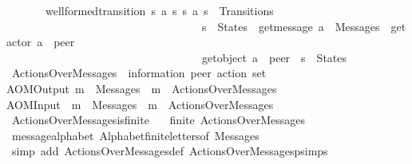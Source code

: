 \begin{isabellebody}
\ \ \ \ \ \ \ well{\isacharunderscore}{\kern0pt}formed{\isacharunderscore}{\kern0pt}transition{\isacharcolon}{\kern0pt}\ {\isachardoublequoteopen}{\isasymAnd}s{}\ a\ s{}{\isachardot}{\kern0pt}\ {\isacharparenleft}{\kern0pt}s{}{\isacharcomma}{\kern0pt}\ a{\isacharcomma}{\kern0pt}\ s{}{\isacharparenright}{\kern0pt}\ {\isasymin}\ Transitions\ {\isasymLongrightarrow}\isanewline
\ \ \ \ \ \ \ \ \ \ \ \ \ \ \ \ \ \ \ \ \ \ \ \ \ \ \ \ \ \ \ \ \ \ \ s{}\ {\isasymin}\ States\ {\isasymand}\ get{\isacharunderscore}{\kern0pt}message\ a\ {\isasymin}\ Messages\ {\isasymand}\ get{\isacharunderscore}{\kern0pt}actor\ a\ {\isacharequal}{\kern0pt}\ peer\ {\isasymand}\isanewline
\ \ \ \ \ \ \ \ \ \ \ \ \ \ \ \ \ \ \ \ \ \ \ \ \ \ \ \ \ \ \ \ \ \ \ get{\isacharunderscore}{\kern0pt}object\ a\ {\isasymnoteq}\ peer\ {\isasymand}\ s{}\ {\isasymin}\ States{\isachardoublequoteclose}\isanewline
{}\isanewline
\isanewline
{}\isamarkupfalse%
\ ActionsOverMessages\ {\isacharcolon}{\kern0pt}{\isacharcolon}{\kern0pt}\ {\isachardoublequoteopen}{\isacharparenleft}{\kern0pt}{\isacharprime}{\kern0pt}information{\isacharcomma}{\kern0pt}\ {\isacharprime}{\kern0pt}peer{\isacharparenright}{\kern0pt}\ action\ set{\isachardoublequoteclose}\ \isanewline
AOMOutput{\isacharcolon}{\kern0pt}\ {\isachardoublequoteopen}m\ {\isasymin}\ Messages\ {\isasymLongrightarrow}\ {\isacharbang}{\kern0pt}{\isasymlangle}m{\isasymrangle}\ {\isasymin}\ ActionsOverMessages{\isachardoublequoteclose}\ {\isacharbar}{\kern0pt}\isanewline
AOMInput{\isacharcolon}{\kern0pt}\ \ {\isachardoublequoteopen}m\ {\isasymin}\ Messages\ {\isasymLongrightarrow}\ {\isacharquery}{\kern0pt}{\isasymlangle}m{\isasymrangle}\ {\isasymin}\ ActionsOverMessages{\isachardoublequoteclose}\isanewline
\isanewline
{}\isamarkupfalse%
\ ActionsOverMessages{\isacharunderscore}{\kern0pt}is{\isacharunderscore}{\kern0pt}finite{\isacharcolon}{\kern0pt}\isanewline
\ \ \ {\isachardoublequoteopen}finite\ ActionsOverMessages{\isachardoublequoteclose}\isanewline
%
\isadelimproof
\ \ %
\endisadelimproof
%
\isatagproof
{}\isamarkupfalse%
\ message{\isacharunderscore}{\kern0pt}alphabet\ Alphabet{\isachardot}{\kern0pt}finite{\isacharunderscore}{\kern0pt}letters{\isacharbrackleft}{\kern0pt}of\ Messages{\isacharbrackright}{\kern0pt}\isanewline
\ \ \isamarkupfalse%
\ {\isacharparenleft}{\kern0pt}simp\ add{\isacharcolon}{\kern0pt}\ ActionsOverMessages{\isacharunderscore}{\kern0pt}def\ ActionsOverMessagesp{\isachardot}{\kern0pt}simps{\isacharparenright}{\kern0pt}%

\end{isabellebody}
